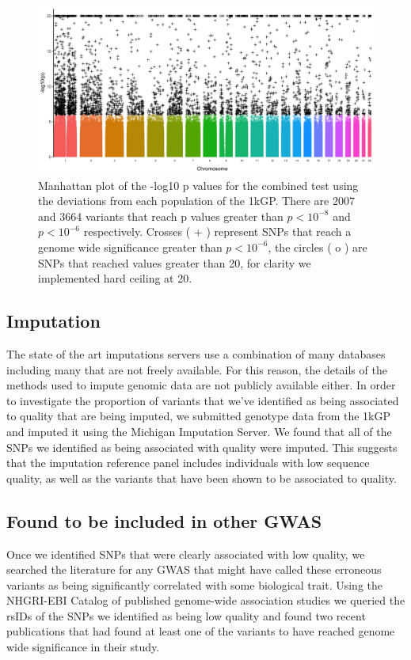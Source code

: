 \documentclass[9pt,lineno]{elife}
\begin{document}
\begin{figure}
\includegraphics[width=\hsize,keepaspectratio]{ManhattanPlot.jpg}

\caption{Manhattan plot of the -log10 p values for the combined test using the deviations from each population of the 1kGP. 
There are 2007 and 3664 variants that reach p values greater than $ p < 10^{-8}$ and $ p < 10^{-6}$ respectively.
Crosses ( + ) represent SNPs that reach a genome wide significance greater than $ p < 10^{-6}$, the circles ( o ) are SNPs that reached values greater than 20, for clarity we implemented hard ceiling at 20.}
  \label{Manhattan}
\end{figure}

	\subsection{Imputation}
The state of the art imputations servers use a combination of many databases including many that are not freely available.
For this reason, the details of the methods used to impute genomic data are not publicly available either.
In order to investigate the proportion of variants that we've identified as being associated to quality that are being imputed, we submitted genotype data from the 1kGP and imputed it using the Michigan Imputation Server.
We found that all of the SNPs we identified as being associated with quality were imputed.
This suggests that the imputation reference panel includes individuals with low sequence quality, as well as the variants that have been shown to be associated to quality. 

	\subsection{Found to be included in other GWAS }
Once we identified SNPs that were clearly associated with low quality, we searched the literature for any GWAS that might have called these erroneous variants as being significantly correlated with some biological trait. 
Using the NHGRI-EBI Catalog of published genome-wide association studies we queried the rsIDs of the SNPs we identified as being low quality and found two recent publications that had found at least one of the variants to have reached genome wide significance in their study.
\end{document}
